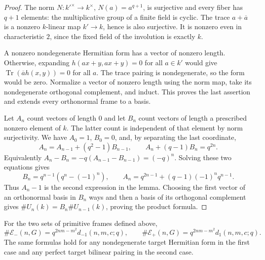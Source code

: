 \begin{proof}
The norm $N:k'^\times\to k^\times$, $N(a)=a^{q+1}$, is
surjective and every fiber has $q+1$ elements: the multiplicative
group of a finite field is cyclic. The trace $a+\overline a$ is
a nonzero $k$-linear map $k'\to k$, hence is also surjective.
It is nonzero even in characteristic $2$, since the fixed field
of the involution is exactly $k$.

A nonzero nondegenerate Hermitian form has a vector of nonzero
length. Otherwise, expanding $h(ax+y,ax+y)=0$ for all $a\in k'$
would give $\operatorname{Tr}(\overline a h(x,y))=0$ for all $a$.
The trace pairing is nondegenerate, so the form would be zero.
Normalize a vector of nonzero length using the norm map, take its
nondegenerate orthogonal complement, and induct. This proves the
last assertion and extends every orthonormal frame to a basis.

Let $A_n$ count vectors of length $0$ and let $B_n$ count vectors
of length a prescribed nonzero element of $k$. The latter count
is independent of that element by norm surjectivity. We have
$A_0=1$, $B_0=0$, and, by separating the last coordinate,
\[
 A_n=A_{n-1}+(q^2-1)B_{n-1},\qquad
 A_n+(q-1)B_n=q^{2n}.
\]
Equivalently $A_n-B_n=-q(A_{n-1}-B_{n-1})=(-q)^n$.
Solving these two equations gives
\[
 B_n=q^{n-1}(q^n-(-1)^n),\qquad
 A_n=q^{2n-1}+(q-1)(-1)^nq^{n-1}.
\]
Thus $A_n-1$ is the second expression in the lemma.
Choosing the first vector of an orthonormal basis in $B_n$ ways
and then a basis of its orthogonal complement gives
$\#U_n(k)=B_n\#U_{n-1}(k)$, proving the product formula.
\end{proof}

\begin{theorem}\label{md-frame-count}
For the two sets of primitive frames defined above,
\[
 \#\mathcal E_-(n,G)=q^{2nm-m^2}d_{-1}(n,m,c;q),\qquad
 \#\mathcal E_+(n,G)=q^{2nm-m^2}d_1(n,m,c;q).
\]
The same formulas hold for any nondegenerate target Hermitian
form in the first case and any perfect target bilinear pairing
in the second case.
\end{theorem}

